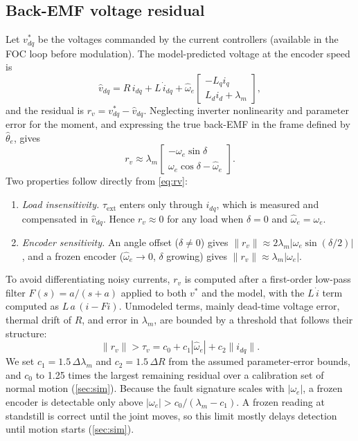 \documentclass[conference]{IEEEtran}
\begin{document}
\subsection{Back-EMF voltage residual}
Let $v^*_{dq}$ be the voltages commanded by the current controllers (available
in the FOC loop before modulation). The model-predicted voltage at the
encoder speed is
\begin{equation}
  \hat v_{dq} = R\,i_{dq} + L\,\dot i_{dq}
   + \hat\omega_e \begin{bmatrix} -L_q i_q \\ L_d i_d + \lambda_m \end{bmatrix},
\end{equation}
and the residual is $r_v = v^*_{dq} - \hat v_{dq}$. Neglecting inverter
nonlinearity and parameter error for the moment, and expressing the true
back-EMF in the frame defined by $\hat\theta_e$, gives
\begin{equation}
  r_v \approx \lambda_m
  \begin{bmatrix} -\omega_e \sin\delta \\ \omega_e\cos\delta - \hat\omega_e \end{bmatrix}.
  \label{eq:rv}
\end{equation}
Two properties follow directly from \cref{eq:rv}:
\begin{enumerate}
  \item \emph{Load insensitivity.} $\tau_\mathrm{ext}$ enters only through
  $i_{dq}$, which is measured and compensated in $\hat v_{dq}$. Hence
  $r_v \approx 0$ for any load when $\delta = 0$ and
  $\hat\omega_e = \omega_e$.
  \item \emph{Encoder sensitivity.} An angle offset ($\delta\ne0$) gives
  $\|r_v\|\approx 2\lambda_m|\omega_e\sin(\delta/2)|$, and a frozen encoder
  ($\hat\omega_e \to 0$, $\delta$ growing) gives
  $\|r_v\|\approx\lambda_m|\omega_e|$.
\end{enumerate}
To avoid differentiating noisy currents, $r_v$ is computed after a first-order
low-pass filter $F(s)=a/(s+a)$ applied to both $v^*$ and the model, with the
$L\,\dot i$ term computed as $L\,a\,(i - F i)$. Unmodeled terms, mainly
dead-time voltage error, thermal drift of $R$, and error in $\lambda_m$, are
bounded by a threshold that follows their structure:
\begin{equation}
  \|r_v\| > \tau_v = c_0 + c_1|\hat\omega_e| + c_2\|i_{dq}\|. \label{eq:thr_v}
\end{equation}
We set $c_1 = 1.5\,\Delta\lambda_m$ and $c_2 = 1.5\,\Delta R$ from the
assumed parameter-error bounds, and $c_0$ to 1.25 times the largest remaining
residual over a calibration set of normal motion (\cref{sec:sim}).
Because the fault signature scales with $|\omega_e|$, a frozen encoder is
detectable only above $|\omega_e| > c_0/(\lambda_m - c_1)$. A frozen reading at
standstill is correct until the joint moves, so this limit mostly delays
detection until motion starts (\cref{sec:sim}).
\end{document}
